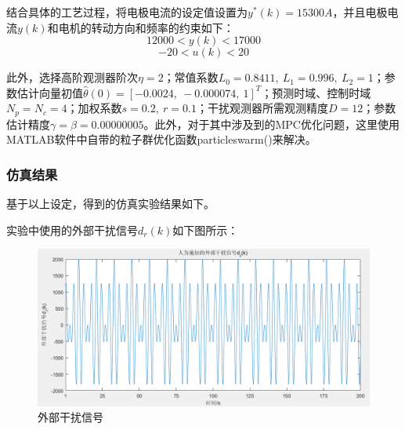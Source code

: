 \documentclass[UTF8, 12pt]{article}
\begin{document}
结合具体的工艺过程，将电极电流的设定值设置为$y^*(k) = 15300A$，并且电极电流$y(k)$和电机的转动方向和频率的约束如下：
\begin{equation*}
	12000 < y(k) < 17000
\end{equation*}
\begin{equation*}
	-20 < u(k) < 20
\end{equation*}

此外，选择高阶观测器阶次$\eta = 2$；常值系数$L_0 = 0.8411,\ L_1 = 0.996,\ L_2 = 1$；参数估计向量初值$\hat{\theta}(0) = [-0.0024,\ -0.000074,\ 1]^T$；预测时域、控制时域$N_p = N_c = 4$；加权系数$s = 0.2,\ r = 0.1$；干扰观测器所需观测精度$D = 12$；参数估计精度$\gamma = \beta = 0.00000005$。此外，对于其中涉及到的MPC优化问题，这里使用MATLAB软件中自带的粒子群优化函数particleswarm()来解决。

\subsubsection{仿真结果}
基于以上设定，得到的仿真实验结果如下。

实验中使用的外部干扰信号$d_r(k)$如下图所示：
\begin{figure}[H]
    \centering %
    \includegraphics[width=.8\textwidth]{figure/模型预测-外部干扰信号.png} 
    \caption{外部干扰信号} %
\end{figure}
\end{document}
